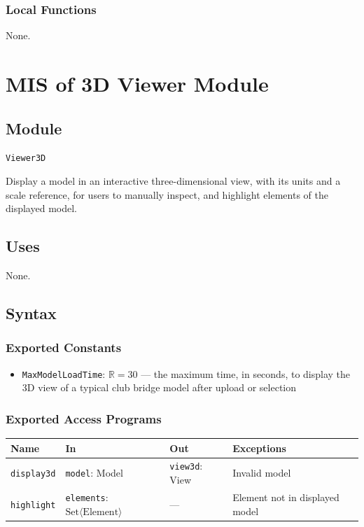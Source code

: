 \documentclass[12pt, titlepage]{article}
\begin{document}
\subsubsection{Local Functions}
None.

\newpage

\section{MIS of 3D Viewer Module} \label{mViewer}

\subsection{Module}
\texttt{Viewer3D}

Display a model in an interactive three-dimensional view, with its units and a scale reference, for users to manually inspect, and highlight elements of the displayed model.

\subsection{Uses}
None.

\subsection{Syntax}

\subsubsection{Exported Constants}
\begin{itemize}
  \item \texttt{MaxModelLoadTime}: $\mathbb{R} = 30$ --- the maximum time, in seconds, to display the 3D view of a typical club bridge model after upload or selection
\end{itemize}

\subsubsection{Exported Access Programs}
\begin{tabularx}{\textwidth}{p{2.9cm} p{3.6cm} p{3.2cm} X}
\toprule
\textbf{Name} & \textbf{In} & \textbf{Out} & \textbf{Exceptions} \\
\midrule
\texttt{display3d} & \texttt{model}: Model & \texttt{view3d}: View & Invalid model \\
\texttt{highlight} & \texttt{elements}: $\text{Set}\langle \text{Element} \rangle$ & --- & Element not in displayed model \\
\bottomrule
\end{tabularx}
\end{document}
